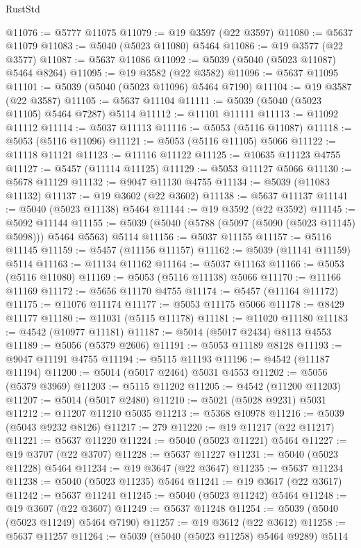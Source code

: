 \begin{lexlean}{RustStd}
\begin{coremodule}
@11076 := @5777 @11075
@11079 := @19 @3597 (@22 @3597)
@11080 := @5637 @11079
@11083 := @5040 (@5023 @11080) @5464
@11086 := @19 @3577 (@22 @3577)
@11087 := @5637 @11086
@11092 := @5039 (@5040 (@5023 @11087) @5464 @8264)
@11095 := @19 @3582 (@22 @3582)
@11096 := @5637 @11095
@11101 := @5039 (@5040 (@5023 @11096) @5464 @7190)
@11104 := @19 @3587 (@22 @3587)
@11105 := @5637 @11104
@11111 := @5039 (@5040 (@5023 @11105) @5464 @7287) @5114
@11112 := @11101 @11111
@11113 := @11092 @11112
@11114 := @5037 @11113
@11116 := @5053 (@5116 @11087)
@11118 := @5053 (@5116 @11096)
@11121 := @5053 (@5116 @11105) @5066
@11122 := @11118 @11121
@11123 := @11116 @11122
@11125 := @10635 @11123 @4755
@11127 := @5457 (@11114 @11125)
@11129 := @5053 @11127 @5066
@11130 := @5678 @11129
@11132 := @9047 @11130 @4755
@11134 := @5039 (@11083 @11132)
@11137 := @19 @3602 (@22 @3602)
@11138 := @5637 @11137
@11141 := @5040 (@5023 @11138) @5464
@11144 := @19 @3592 (@22 @3592)
@11145 := @5092 @11144
@11155 := @5039 (@5040 (@5788 (@5097 (@5090 (@5023 @11145) @5098))) @5464 @5563) @5114
@11156 := @5037 @11155
@11157 := @5116 @11145
@11159 := @5457 (@11156 @11157)
@11162 := @5039 (@11141 @11159) @5114
@11163 := @11134 @11162
@11164 := @5037 @11163
@11166 := @5053 (@5116 @11080)
@11169 := @5053 (@5116 @11138) @5066
@11170 := @11166 @11169
@11172 := @5656 @11170 @4755
@11174 := @5457 (@11164 @11172)
@11175 := @11076 @11174
@11177 := @5053 @11175 @5066
@11178 := @8429 @11177
@11180 := @11031 (@5115 @11178)
@11181 := @11020 @11180
@11183 := @4542 (@10977 @11181)
@11187 := @5014 (@5017 @2434) @8113 @4553
@11189 := @5056 (@5379 @2606)
@11191 := @5053 @11189 @8128
@11193 := @9047 @11191 @4755
@11194 := @5115 @11193
@11196 := @4542 (@11187 @11194)
@11200 := @5014 (@5017 @2464) @5031 @4553
@11202 := @5056 (@5379 @3969)
@11203 := @5115 @11202
@11205 := @4542 (@11200 @11203)
@11207 := @5014 (@5017 @2480)
@11210 := @5021 (@5028 @9231) @5031
@11212 := @11207 @11210 @5035
@11213 := @5368 @10978
@11216 := @5039 (@5043 @9232 @8126)
@11217 := 279
@11220 := @19 @11217 (@22 @11217)
@11221 := @5637 @11220
@11224 := @5040 (@5023 @11221) @5464
@11227 := @19 @3707 (@22 @3707)
@11228 := @5637 @11227
@11231 := @5040 (@5023 @11228) @5464
@11234 := @19 @3647 (@22 @3647)
@11235 := @5637 @11234
@11238 := @5040 (@5023 @11235) @5464
@11241 := @19 @3617 (@22 @3617)
@11242 := @5637 @11241
@11245 := @5040 (@5023 @11242) @5464
@11248 := @19 @3607 (@22 @3607)
@11249 := @5637 @11248
@11254 := @5039 (@5040 (@5023 @11249) @5464 @7190)
@11257 := @19 @3612 (@22 @3612)
@11258 := @5637 @11257
@11264 := @5039 (@5040 (@5023 @11258) @5464 @9289) @5114

\end{coremodule}
\end{lexlean}
